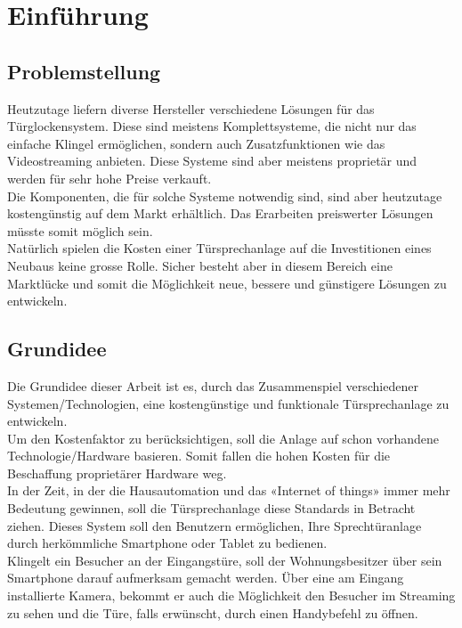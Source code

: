 \section{Einführung}
\label{sec:chapterexample}

\subsection{Problemstellung}
\label{sec:chapterexample}

Heutzutage liefern diverse Hersteller verschiedene Lösungen für das Türglockensystem. Diese sind meistens Komplettsysteme, die nicht nur das einfache Klingel ermöglichen, sondern auch Zusatzfunktionen wie das Videostreaming anbieten. Diese Systeme sind aber meistens proprietär und werden für sehr hohe Preise verkauft.
\\
Die Komponenten, die für solche Systeme notwendig sind, sind aber heutzutage kostengünstig auf dem Markt erhältlich. Das Erarbeiten preiswerter Lösungen müsste somit möglich sein. 
\\
Natürlich spielen die Kosten einer Türsprechanlage auf die Investitionen eines Neubaus keine grosse Rolle. Sicher besteht aber in diesem Bereich eine Marktlücke und somit die Möglichkeit neue, bessere und günstigere Lösungen zu entwickeln.  

\subsection{Grundidee}
\label{sec:chapterexample}

Die Grundidee dieser Arbeit ist es, durch das Zusammenspiel verschiedener Systemen/Technologien, eine kostengünstige und funktionale Türsprechanlage zu entwickeln.
\\ 
Um den Kostenfaktor zu berücksichtigen, soll die Anlage auf schon vorhandene Technologie/Hardware basieren. Somit fallen die hohen Kosten für die Beschaffung proprietärer Hardware weg.
\\
In der Zeit, in der die Hausautomation und das «Internet of things» immer mehr Bedeutung gewinnen, soll die Türsprechanlage diese Standards in Betracht ziehen.   
Dieses System soll den Benutzern ermöglichen, Ihre Sprechtüranlage durch herkömmliche Smartphone oder Tablet zu bedienen.
\\
Klingelt ein Besucher an der Eingangstüre, soll der Wohnungsbesitzer über sein Smartphone darauf aufmerksam gemacht werden. Über eine am Eingang installierte Kamera, bekommt er auch die Möglichkeit den Besucher im Streaming zu sehen und die Türe, falls erwünscht, durch einen Handybefehl zu öffnen. 
\newpage

